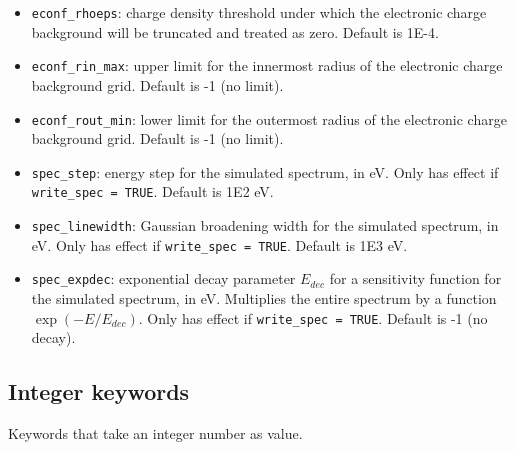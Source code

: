 \documentclass[]{article}
\begin{document}
\begin{itemize}
	\item \texttt{econf\_rhoeps}: charge density threshold under which the electronic charge background will be truncated and treated as zero. Default is 1E-4.
	\item \texttt{econf\_rin\_max}: upper limit for the innermost radius of the electronic charge background grid. Default is -1 (no limit).
	\item \texttt{econf\_rout\_min}: lower limit for the outermost radius of the electronic charge background grid. Default is -1 (no limit).
	\item \texttt{spec\_step}: energy step for the simulated spectrum, in eV. Only has effect if \texttt{write\_spec = TRUE}. Default is 1E2 eV.
	\item \texttt{spec\_linewidth}: Gaussian broadening width for the simulated spectrum, in eV. Only has effect if \texttt{write\_spec = TRUE}. Default is 1E3 eV.
	\item \texttt{spec\_expdec}: exponential decay parameter $E_{dec}$ for a sensitivity function for the simulated spectrum, in eV. Multiplies the entire spectrum by a function $\exp(-E/E_{dec})$. Only has effect if \texttt{write\_spec = TRUE}. Default is -1 (no decay).
\end{itemize}

\subsection{Integer keywords}

Keywords that take an integer number as value.
\end{document}
